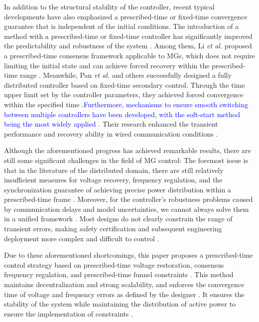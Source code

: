 \documentclass[]{interact}
\theoremstyle{plain}%
\theoremstyle{definition}
\theoremstyle{remark}
\begin{document}
In addition to the structural stability of the controller, recent typical developments have also emphasized a prescribed-time or fixed-time convergence guarantee that is independent of the initial conditions. The introduction of a method with a prescribed-time or fixed-time controller has significantly improved the predictability and robustness of the system \citep{Akhijahani2023,Fei2023,Zhiping2023,Wei2023}. 
Among them, Li \emph{et al.} proposed a prescribed-time consensus framework applicable to MGs, which does not require limiting the initial state and can achieve forced recovery within the prescribed-time range \citep{Li2025_A}. Meanwhile, Pan \emph{et al.} and others successfully designed a fully distributed controller based on fixed-time secondary control. Through the time upper limit set by the controller parameters, they achieved forced convergence within the specified time \citep{Panbao2020}.\textcolor{blue}{Furthermore, mechanisms to ensure smooth switching between multiple controllers have been developed, with the soft-start method being the most widely applied
\citep{WenSoft2023,Sathish2018,LiSoft2023}.} Their research enhanced the transient performance and recovery ability in wired communication conditions \citep{Chang2024}.

Although the aforementioned progress has achieved remarkable results, there are still some significant challenges in the field of MG control: The foremost issue is that in the literature of the distributed domain, there are still relatively insufficient measures for voltage recovery, frequency regulation, and the synchronization guarantee of achieving precise power distribution within a prescribed-time frame \citep{Louassaa2025,Li2025}. Moreover, for the controller's robustness problems caused by communication delays and model uncertainties, we cannot always solve them in a unified framework \citep{Zhong2024,Rueda2024}. Most designs do not clearly constrain the range of transient errors, making safety certification and subsequent engineering deployment more complex and difficult to control \citep{Hou2025,Lakshmi2025}.   

Due to these aforementioned shortcomings, this paper proposes a prescribed-time control strategy based on prescribed-time voltage restoration, consensus frequency regulation, and prescribed-time funnel constraints \citep{Wang2024,Guoping2024,Kinga2024}. This method maintains decentralization and strong scalability, and enforces the convergence time of voltage and frequency errors as defined by the designer \citep{Chang2024,Fei2023}. It ensures the stability of the system while maintaining the distribution of active power to ensure the implementation of constraints \citep{Abdurraqeeb2024,Rueda2024}.    
\end{document}
